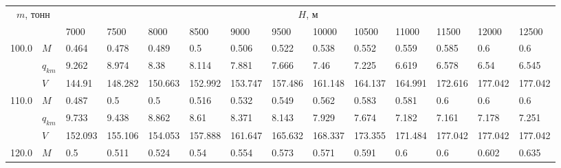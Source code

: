 \begin{tabular}{|l|l|llllllllllll|}\hline
\multicolumn{2}{|c|}{$m$, тонн}& \multicolumn{12}{c|}{$H$, м}\\ 
 \cline{3-14}
 \multicolumn{2}{|c|}{}&     7000 &     7500 &                      8000 &                     8500 &                      9000 &                      9500 &                     10000 &    10500 &                     11000 &                     11500 &                     12000 &    12500 \\
\hline
100.0 & $M$ &    0.464 &    0.478 &                     0.489 &                      0.5 &                     0.506 &                     0.522 &                     0.538 &    0.552 &                     0.559 &                     0.585 &      0.6\cellcolor{green} &      0.6 \\
      & $q_{km}$ &    9.262 &    8.974 &                      8.38 &                    8.114 &                     7.881 &                     7.666 &                      7.46 &    7.225 &                     6.619 &                     6.578 &     6.54\cellcolor{green} &    6.545 \\
      & $V$ &   144.91 &  148.282 &                   150.663 &                  152.992 &                   153.747 &                   157.486 &                   161.148 &  164.137 &                   164.991 &                   172.616 &  177.042\cellcolor{green} &  177.042 \\
\hline
110.0 & $M$ &    0.487 &      0.5 &                       0.5 &                    0.516 &                     0.532 &                     0.549 &                     0.562 &    0.583 &                     0.581 &      0.6\cellcolor{green} &                       0.6 &      0.6 \\
      & $q_{km}$ &    9.733 &    9.438 &                     8.862 &                     8.61 &                     8.371 &                     8.143 &                     7.929 &    7.674 &                     7.182 &    7.161\cellcolor{green} &                     7.178 &    7.251 \\
      & $V$ &  152.093 &  155.106 &                   154.053 &                  157.888 &                   161.647 &                   165.632 &                   168.337 &  173.355 &                   171.484 &  177.042\cellcolor{green} &                   177.042 &  177.042 \\
\hline
120.0 & $M$ &      0.5 &    0.511 &                     0.524 &                     0.54 &                     0.554 &                     0.573 &                     0.571 &    0.591 &      0.6\cellcolor{green} &                       0.6 &                     0.602 &    0.635 \\

\end{tabular}
